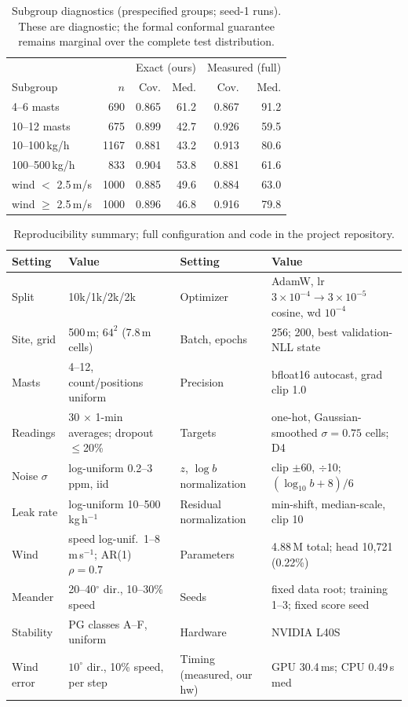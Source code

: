 \documentclass[conference]{IEEEtran}
\begin{document}
\begin{table}[h]
\centering
\caption{Subgroup diagnostics (prespecified groups; seed-1 runs). These are diagnostic; the formal conformal guarantee remains marginal over the complete test distribution.}
\label{tab:subgroup}
\begin{tabular}{lrrrrr}
\toprule
 & & \multicolumn{2}{c}{Exact (ours)} &
\multicolumn{2}{c}{Measured (full)} \\
Subgroup & $n$ & Cov. & Med. & Cov. & Med. \\
\midrule
4--6 masts & 690 & 0.865 & 61.2 & 0.867 & 91.2 \\
10--12 masts & 675 & 0.899 & 42.7 & 0.926 & 59.5 \\
10--100\,kg/h & 1167 & 0.881 & 43.2 & 0.913 & 80.6 \\
100--500\,kg/h & 833 & 0.904 & 53.8 & 0.881 & 61.6 \\
wind $<$ 2.5\,m/s & 1000 & 0.885 & 49.6 & 0.884 & 63.0 \\
wind $\ge$ 2.5\,m/s & 1000 & 0.896 & 46.8 & 0.916 & 79.8 \\
\bottomrule
\end{tabular}
\end{table}

\begin{table}[h]
\centering
\caption{Reproducibility summary; full configuration and code in the project repository.}
\begin{tabular}{llll}
\toprule
Setting & Value & Setting & Value \\
\midrule
Split & 10k/1k/2k/2k & Optimizer & AdamW, lr $3{\times}10^{-4}\!\to\!3{\times}10^{-5}$ cosine, wd $10^{-4}$ \\
Site, grid & 500\,m; $64^2$ (7.8\,m cells) & Batch, epochs & 256; 200, best validation-NLL state \\
Masts & 4--12, count/positions uniform & Precision & bfloat16 autocast, grad clip 1.0 \\
Readings & 30 $\times$ 1-min averages; dropout $\le$20\% & Targets & one-hot, Gaussian-smoothed $\sigma{=}0.75$ cells; D4 \\
Noise $\sigma$ & log-uniform 0.2--3\,ppm, iid & $z$, $\log b$ normalization & clip $\pm$60, $\div$10; $(\log_{10}b{+}8)/6$ \\
Leak rate & log-uniform 10--500\,kg\,h$^{-1}$ & Residual normalization & min-shift, median-scale, clip 10 \\
Wind & speed log-unif.\ 1--8\,m\,s$^{-1}$; AR(1) $\rho{=}0.7$ & Parameters & 4.88\,M total; head 10{,}721 (0.22\%) \\
Meander & 20--40$^\circ$ dir., 10--30\% speed & Seeds & fixed data root; training 1--3; fixed score seed \\
Stability & PG classes A--F, uniform & Hardware & NVIDIA L40S \\
Wind error & $10^\circ$ dir., 10\% speed, per step & Timing (measured, our hw) & GPU 30.4\,ms; CPU 0.49\,s med \\
\bottomrule
\end{tabular}
\end{table}
\end{document}
